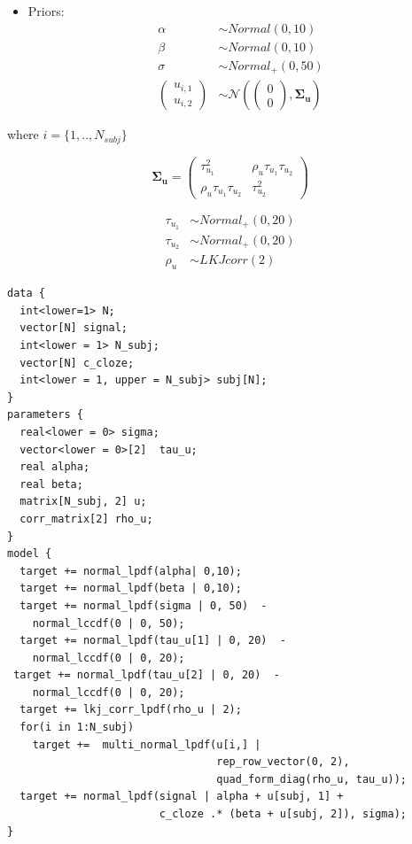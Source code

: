 \documentclass[12pt,]{krantz}
\providecommand{\tightlist}{%
  \setlength{\itemsep}{0pt}\setlength{\parskip}{0pt}}
\theoremstyle{definition}
\theoremstyle{definition}
\theoremstyle{definition}
\theoremstyle{remark}
\begin{document}
\begin{itemize}
\tightlist
\item
  Priors:
  \begin{equation}
   \begin{aligned} 
   \alpha & \sim Normal(0,10) \\
   \beta  & \sim Normal(0,10) \\
    \sigma  &\sim Normal_+(0,50)\\
    {\begin{pmatrix}
    u_{i,1} \\
    u_{i,2}
    \end{pmatrix}}
   &\sim {\mathcal {N}}
    \left(
   {\begin{pmatrix} 
    0\\
    0
   \end{pmatrix}}
   ,\boldsymbol{\Sigma_u} \right)
   \end{aligned}
   \end{equation}
\end{itemize}

where \(i = \{1, .., N_{subj} \}\)

\begin{equation}
\boldsymbol{\Sigma_u} = 
{\begin{pmatrix} 
\tau_{u_1}^2 & \rho_u \tau_{u_1} \tau_{u_2} \\ 
\rho_u \tau_{u_1} \tau_{u_2} & \tau_{u_2}^2
\end{pmatrix}}
\end{equation}

\begin{equation}
\begin{aligned}
\tau_{u_1} &\sim Normal_+(0,20)\\
\tau_{u_2} &\sim Normal_+(0,20)\\
\rho_u &\sim LKJcorr(2) 
\end{aligned}
\end{equation}

\begin{verbatim}
data {
  int<lower=1> N;
  vector[N] signal;
  int<lower = 1> N_subj;
  vector[N] c_cloze;
  int<lower = 1, upper = N_subj> subj[N]; 
}
parameters {
  real<lower = 0> sigma;
  vector<lower = 0>[2]  tau_u;   
  real alpha;
  real beta;
  matrix[N_subj, 2] u;
  corr_matrix[2] rho_u;
}
model {
  target += normal_lpdf(alpha| 0,10);
  target += normal_lpdf(beta | 0,10);
  target += normal_lpdf(sigma | 0, 50)  -
    normal_lccdf(0 | 0, 50);
  target += normal_lpdf(tau_u[1] | 0, 20)  - 
    normal_lccdf(0 | 0, 20);
 target += normal_lpdf(tau_u[2] | 0, 20)  - 
    normal_lccdf(0 | 0, 20);
  target += lkj_corr_lpdf(rho_u | 2);
  for(i in 1:N_subj)
    target +=  multi_normal_lpdf(u[i,] |
                                 rep_row_vector(0, 2),
                                 quad_form_diag(rho_u, tau_u));
  target += normal_lpdf(signal | alpha + u[subj, 1] +
                        c_cloze .* (beta + u[subj, 2]), sigma);
}
\end{verbatim}
\end{document}
